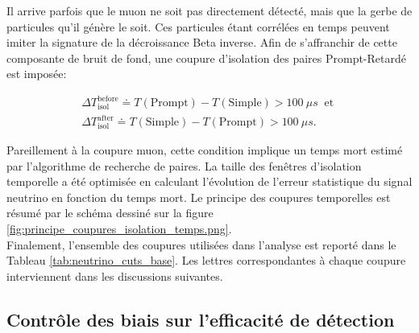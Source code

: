 Il arrive parfois que le muon ne soit pas directement détecté, mais que la gerbe de particules qu'il génère le soit. Ces particules étant corrélées en temps peuvent imiter la signature de la décroissance Beta inverse. Afin de s'affranchir de cette composante de bruit de fond, une coupure d'isolation des paires Prompt-Retardé est imposée:

\begin{equation}
\label{eq:isolation_cut}
    \begin{gathered}
        \Delta T_\textrm{isol}^\textrm{before} \doteq T(\textrm{Prompt}) - T(\textrm{Simple}) > \SI{100}{\mu s} \ \textrm{ et }\\
    \Delta T_\textrm{isol}^\textrm{after} \doteq T(\textrm{Simple}) - T(\textrm{Prompt}) > \SI{100}{\mu s}.
    \end{gathered}
\end{equation}

\bigbreak

Pareillement à la coupure muon, cette condition implique un temps mort estimé par l'algorithme de recherche de paires. La taille des fenêtres d'isolation temporelle a été optimisée en calculant l'évolution de l'erreur statistique du signal neutrino en fonction du temps mort. Le principe des coupures temporelles est résumé par le schéma dessiné sur la figure \ref{fig:principe_coupures_isolation_temps.png}.\\

Finalement, l'ensemble des coupures utilisées dans l'analyse est reporté dans le Tableau \ref{tab:neutrino_cuts_base}. Les lettres correspondantes à chaque coupure interviennent dans les discussions suivantes.


\bigbreak

\subsection{Contrôle des biais sur l'efficacité de détection}
\label{sec:neutrino_biases_eff}

